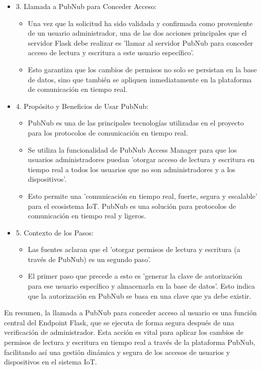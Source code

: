 \documentclass{report}
\begin{document}
\begin{itemize}
\begin{itemize}
        \end{itemize}
    \item 3. Llamada a PubNub para Conceder Acceso:
        \begin{itemize}
            \item Una vez que la solicitud ha sido validada y confirmada como proveniente de un usuario administrador, una de las dos acciones 
            principales que el servidor Flask debe realizar es 'llamar al servidor PubNub para conceder acceso de lectura y escritura a este 
            usuario específico'.
            \item Esto garantiza que los cambios de permisos no solo se persistan en la base de datos, sino que también se apliquen inmediatamente 
            en la plataforma de comunicación en tiempo real.
        \end{itemize}
    \item 4. Propósito y Beneficios de Usar PubNub:
        \begin{itemize}
            \item PubNub es una de las principales tecnologías utilizadas en el proyecto para los protocolos de comunicación en tiempo real.
            \item Se utiliza la funcionalidad de PubNub Access Manager para que los usuarios administradores puedan 'otorgar acceso de lectura 
            y escritura en tiempo real a todos los usuarios que no son administradores y a los dispositivos'.
            \item Esto permite una 'comunicación en tiempo real, fuerte, segura y escalable' para el ecosistema IoT. PubNub es una solución para 
            protocolos de comunicación en tiempo real y ligeros.
        \end{itemize}
    \item 5. Contexto de los Pasos:
        \begin{itemize}
            \item Las fuentes aclaran que el 'otorgar permisos de lectura y escritura (a través de PubNub) es un segundo paso'.
            \item El primer paso que precede a esto es 'generar la clave de autorización para ese usuario específico y almacenarla en la base de datos'. 
            Esto indica que la autorización en PubNub se basa en una clave que ya debe existir.
        \end{itemize}
\end{itemize}
En resumen, la llamada a PubNub para conceder acceso al usuario es una función central del Endpoint Flask, que se ejecuta de forma 
segura después de una verificación de administrador. Esta acción es vital para aplicar los cambios de permisos de lectura y escritura 
en tiempo real a través de la plataforma PubNub, facilitando así una gestión dinámica y segura de los accesos de usuarios y dispositivos 
en el sistema IoT.
\end{document}
